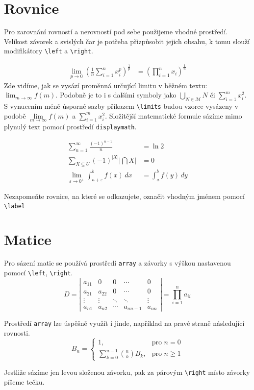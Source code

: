 \documentclass[a4paper,11pt,twocolumn]{article}
\begin{document}
\section{Rovnice}
Pro zarovnání rovností a nerovností pod sebe použijeme vhodné prostředí. Velikost závorek a svislých čar je potřeba přizpůsobit jejich obsahu, k tomu slouží modifikátory \verb|\left| a \verb|\right|.

\begin{align}
\lim_{p \to 0} \left( \frac{1}{n} \sum_{i=1}^{n} x_i^p \right)^{\frac{1}{p}} &= \left( \prod_{i=1}^{n} x_i \right)^{\frac{1}{n}} \label{eq4}
\end{align}
Zde vidíme, jak se vysází proměnná určující limitu v běžném textu: $\lim_{m \to \infty} f(m)$. Podobně je to i s dalšími symboly jako $\bigcup_{N \in \mathcal{M}} N$ či $\sum_{i=1}^{m} x_i^2$. S vynucením méně úsporné sazby příkazem \verb|\limits| budou vzorce vysázeny v podobě $\lim\limits_{m \to \infty} f(m)$ a $\sum\limits_{i=1}^{m} x_i^2$. Složitější matematické formule sázíme mimo plynulý text pomocí prostředí \verb|displaymath|.

\begin{align}
\sum_{n=1}^{\infty} \frac{(-1)^{n-1}}{n} &= \ln 2 \label{eq5} \\
\sum_{X \subseteq U} (-1)^{|X|} \left| \bigcap X \right| &= 0 \label{eq6} \\
\lim_{\varepsilon \to 0^+} \int_{a+\varepsilon}^{b} f(x) \, dx &= \int_a^b f(y) \, dy \label{eq7}
\end{align}

\noindent Nezapomeňte rovnice, na které se odkazujete, označit vhodným jménem pomocí \verb|\label| 

\section{Matice}
Pro sázení matic se používá prostředí \verb|array| a závorky s výškou nastavenou pomocí \verb|\left|, \verb|\right|.
\begin{displaymath}
D = \left| \begin{array}{cccccc}
a_{11} & 0 & 0 & \cdots & 0 \\
a_{21} & a_{22} & 0 & \cdots & 0 \\
\vdots & \vdots & \ddots & \ddots & \vdots \\
a_{n1} & a_{n2} & \cdots & a_{nn-1} & a_{nn}
\end{array}
\right|
= \prod_{i=1}^{n} a_{ii}
\end{displaymath}

Prostředí \verb|array| lze úspěšně využít i jinde, například na pravé straně následující rovnosti.
\begin{displaymath}
B_n = \left\{ \begin{array}{ll}
1, & \text{pro } n = 0 \\[1ex]
\displaystyle \sum_{k=0}^{n-1} \binom{n}{k} B_k, & \text{pro } n \ge 1
\end{array}
\right.
\end{displaymath}

Jestliže sázíme jen levou složenou závorku, pak za párovým \verb|\right| místo závorky píšeme tečku.
\end{document}
